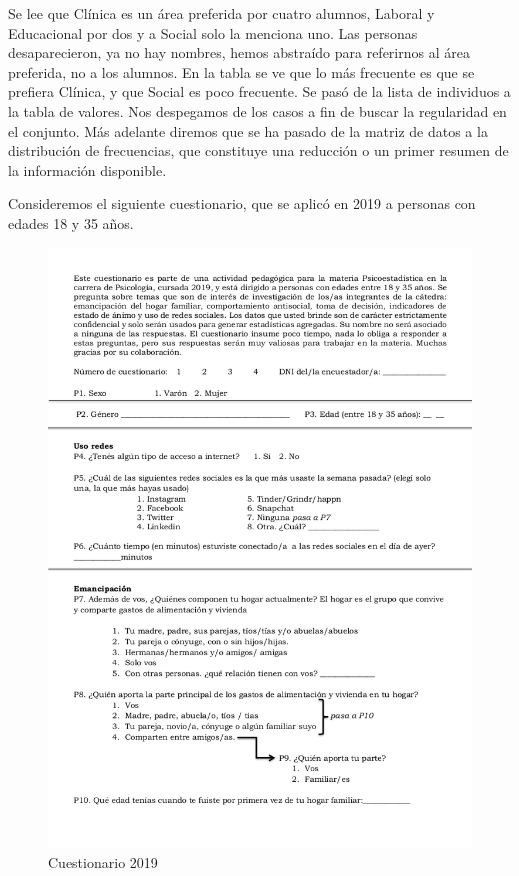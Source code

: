 \documentclass[]{book}
\begin{document}
Se lee que Clínica es un área preferida por cuatro alumnos, Laboral y Educacional por dos y a Social solo la menciona uno. Las personas desaparecieron, ya no hay nombres, hemos abstraído para referirnos al área preferida, no a los alumnos. En la tabla se ve que lo más frecuente es que se prefiera Clínica, y que Social es poco frecuente. Se pasó de la lista de individuos a la tabla de valores. Nos despegamos de los casos a fin de buscar la regularidad en el conjunto. Más adelante diremos que se ha pasado de la matriz de datos a la distribución de frecuencias, que constituye una reducción o un primer resumen de la información disponible.

Consideremos el siguiente cuestionario, que se aplicó en 2019 a personas con edades 18 y 35 años.

\begin{figure}

{\centering \includegraphics[width=11.47in]{imagenes/cuestionario2019_01} 

}

\caption{Cuestionario 2019}\label{fig:cuestionario}
\end{figure}
\end{document}
